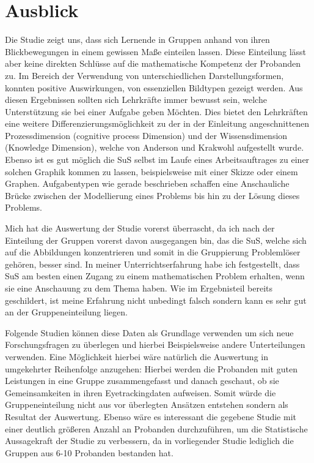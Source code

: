 \chapter{Ausblick}
Die Studie zeigt uns, dass sich Lernende in Gruppen anhand von ihren Blickbewegungen in einem gewissen Maße einteilen lassen. Diese Einteilung lässt aber keine direkten Schlüsse auf die mathematische Kompetenz der Probanden zu.  Im Bereich der Verwendung von unterschiedlichen Darstellungsformen, konnten positive Auswirkungen, von essenziellen Bildtypen gezeigt werden.  Aus diesen Ergebnissen sollten sich Lehrkräfte immer bewusst sein, welche Unterstützung sie bei einer Aufgabe geben Möchten. Dies bietet den Lehrkräften eine weitere Differenzierungsmöglichkeit zu der in der Einleitung angeschnittenen Prozessdimension (cognitive process Dimension) und der Wissensdimension (Knowledge Dimension), welche von Anderson und Krakwohl aufgestellt wurde\cite{anderson2001taxonomy}. Ebenso ist es gut möglich die SuS selbst im Laufe eines Arbeitsauftrages zu einer solchen Graphik kommen zu lassen, beispielsweise mit einer Skizze oder einem Graphen. Aufgabentypen wie gerade beschrieben schaffen eine Anschauliche Brücke zwischen der Modellierung eines Problems bis hin zu der Lösung dieses Problems.


Mich hat die Auswertung der Studie vorerst überrascht, da ich nach der Einteilung der Gruppen vorerst davon ausgegangen bin, das die SuS, welche sich auf die Abbildungen konzentrieren und somit in die Gruppierung Problemlöser gehören, besser sind. In meiner Unterrichtserfahrung habe ich festgestellt, dass SuS am besten einen Zugang zu einem mathematischen Problem erhalten, wenn sie eine Anschauung zu dem Thema haben. Wie im Ergebnisteil bereits geschildert, ist meine Erfahrung nicht unbedingt falsch sondern kann es sehr gut an der Gruppeneinteilung liegen. 


Folgende Studien können diese Daten als Grundlage verwenden um sich neue Forschungsfragen zu überlegen und hierbei Beispielsweise andere Unterteilungen verwenden. Eine Möglichkeit hierbei wäre natürlich die Auswertung in umgekehrter Reihenfolge anzugehen: Hierbei werden die Probanden mit guten Leistungen in eine Gruppe zusammengefasst und danach geschaut, ob sie Gemeinsamkeiten in ihren Eyetrackingdaten aufweisen. Somit würde die Gruppeneinteilung nicht aus vor überlegten Ansätzen entstehen sondern als Resultat der Auswertung. 
Ebenso wäre es interessant die gegebene Studie mit einer deutlich größeren Anzahl an Probanden durchzuführen, um die Statistische Aussagekraft der Studie zu verbessern, da in vorliegender Studie lediglich die Gruppen aus 6-10 Probanden bestanden hat.